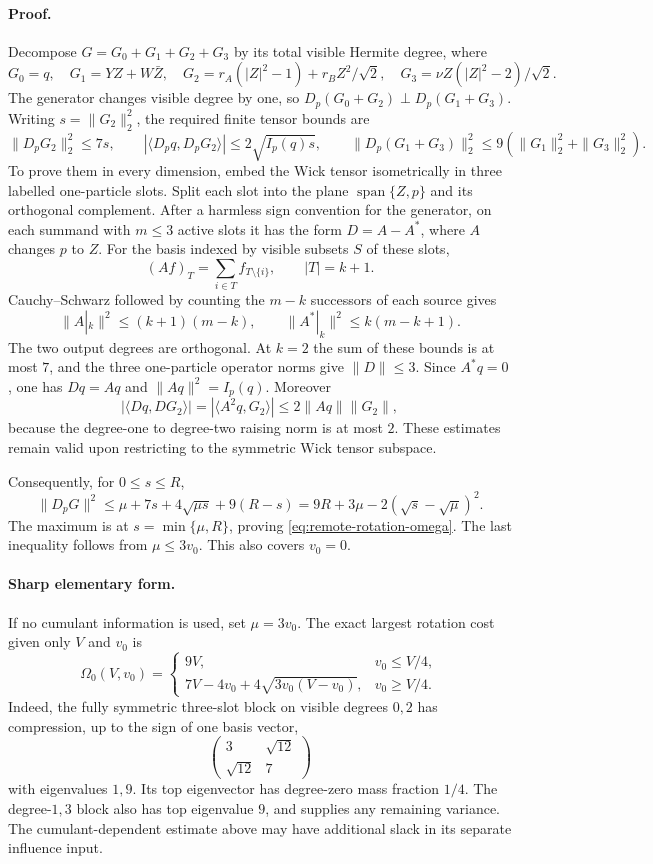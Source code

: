 \paragraph{Proof.}
Decompose $G=G_0+G_1+G_2+G_3$ by its total visible Hermite degree, where
\[
 G_0=q,\quad G_1=YZ+W\bar Z,\quad
 G_2=r_A(|Z|^2-1)+r_BZ^2/\sqrt2,\quad
 G_3=\nu Z(|Z|^2-2)/\sqrt2.
\]
The generator changes visible degree by one, so
$D_p(G_0+G_2)\perp D_p(G_1+G_3)$. Writing $s=\|G_2\|_2^2$, the required
finite tensor bounds are
\[
 \|D_pG_2\|_2^2\le7s,\qquad
 |\langle D_pq,D_pG_2\rangle|\le2\sqrt{I_p(q)s},\qquad
 \|D_p(G_1+G_3)\|_2^2\le9(\|G_1\|_2^2+\|G_3\|_2^2).
\]
To prove them in every dimension, embed the Wick tensor isometrically in
three labelled one-particle slots. Split each slot into the plane
$\operatorname{span}\{Z,p\}$ and its orthogonal complement. After a harmless
sign convention for the generator, on each summand with $m\le3$ active
slots it has the form $D=A-A^*$, where $A$ changes $p$ to $Z$.
For the basis indexed by visible subsets $S$ of these slots,
\[
 (Af)_T=\sum_{i\in T}f_{T\setminus\{i\}},\qquad |T|=k+1.
\]
Cauchy--Schwarz followed by counting the $m-k$ successors of each source
gives
\[
 \|A|_k\|^2\le(k+1)(m-k),\qquad
 \|A^*|_k\|^2\le k(m-k+1).
\]
The two output degrees are orthogonal. At $k=2$ the sum of these bounds
is at most $7$, and the three one-particle operator norms give
$\|D\|\le3$. Since $A^*q=0$, one has $Dq=Aq$ and
$\|Aq\|^2=I_p(q)$. Moreover
\[
 |\langle Dq,DG_2\rangle|
 =|\langle A^2q,G_2\rangle|
 \le2\|Aq\|\|G_2\|,
\]
because the degree-one to degree-two raising norm is at most $2$.
These estimates remain valid upon restricting to the symmetric Wick
tensor subspace.

Consequently, for $0\le s\le R$,
\[
 \|D_pG\|^2\le\mu+7s+4\sqrt{\mu s}+9(R-s)
 =9R+3\mu-2(\sqrt s-\sqrt\mu)^2.
\]
The maximum is at $s=\min\{\mu,R\}$, proving
\eqref{eq:remote-rotation-omega}. The last inequality follows from
$\mu\le3v_0$. This also covers $v_0=0$.

\paragraph{Sharp elementary form.}
If no cumulant information is used, set $\mu=3v_0$. The exact largest
rotation cost given only $V$ and $v_0$ is
\[
 \Omega_0(V,v_0)=
 \begin{cases}
 9V,&v_0\le V/4,\\
 7V-4v_0+4\sqrt{3v_0(V-v_0)},&v_0\ge V/4.
 \end{cases}
\]
Indeed, the fully symmetric three-slot block on visible degrees $0,2$
has compression, up to the sign of one basis vector,
\[
 \begin{pmatrix}3&\sqrt{12}\\\sqrt{12}&7\end{pmatrix}
\]
with eigenvalues $1,9$. Its top eigenvector has degree-zero mass fraction
$1/4$. The degree-$1,3$ block also has top eigenvalue $9$, and supplies
any remaining variance. The cumulant-dependent estimate above may have
additional slack in its separate influence input.

